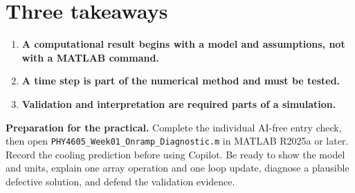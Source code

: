 \documentclass[11pt,a4paper]{article}
\begin{document}
\section*{Three takeaways}
\begin{enumerate}[nosep,leftmargin=5mm]
  \item \textbf{A computational result begins with a model and assumptions, not with a MATLAB command.}
  \item \textbf{A time step is part of the numerical method and must be tested.}
  \item \textbf{Validation and interpretation are required parts of a simulation.}
\end{enumerate}

\begin{keybox}
\textbf{Preparation for the practical.} Complete the individual AI-free entry check, then open \texttt{PHY4605\_Week01\_Onramp\_Diagnostic.m} in MATLAB R2025a or later. Record the cooling prediction before using Copilot. Be ready to show the model and units, explain one array operation and one loop update, diagnose a plausible defective solution, and defend the validation evidence.
\end{keybox}
\end{document}
